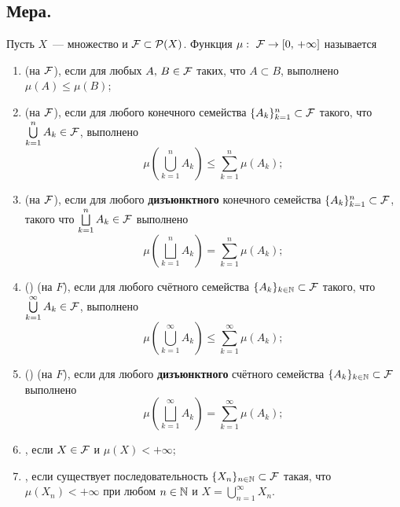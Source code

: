 \subsection{Мера.}

\begin{definition}
    Пусть $X$~--- множество и $\mathcal{F} \subset\mathcal{P}(X)$. Функция $\mu:\ \mathcal{F} \rightarrow[0,\,+\infty]$
    называется
    \begin{enumerate}
        \item {} (на $\mathcal{F} $), если для любых $A,\, B\in\mathcal{F} $ таких, что 
        $A\subset B$, выполнено $\mu(A)\leqslant \mu(B)$;

        \item {} (на $\mathcal{F} $), если для любого конечного
        семейства $\{A_k\}_{k=1}^n\subset\mathcal{F} $ такого, что $\bigcup\limits_{k=1}^n A_k\in\mathcal{F} $, 
        выполнено
        \[
            \mu\left(\bigcup_{k=1}^nA_k\right)\leqslant\sum_{k=1}^n\mu(A_k);
        \]
        
        \item {} (на $\mathcal{F} $), если для любого \textbf{дизъюнктного} 
        конечного семейства $\{A_k\}_{k=1}^n\subset\mathcal{F} $, такого что 
        $\bigsqcup\limits_{k=1}^n A_k\in\mathcal{F} $ выполнено 
        \[
            \mu\left(\bigsqcup_{k=1}^nA_k\right)=\sum_{k=1}^n\mu(A_k);
        \]
        
        \item {} () (на $F$), если для любого счётного семейства
        $\{A_k\}_{k\in\mathbb{N}}\subset\mathcal{F} $ такого, что $\bigcup\limits_{k=1}^{\infty} A_k\in\mathcal{F} $,
        выполнено 
        \[
            \mu\left(\bigcup_{k=1}^{\infty}A_k\right)\leqslant\sum_{k=1}^{\infty}\mu(A_k);
        \]
        
        \item {} () (на $F$), если для любого \textbf{дизъюнктного} счётного
        семейства $\{A_k\}_{k\in\mathbb{N}}\subset\mathcal{F} $ выполнено
        \[
            \mu\left(\bigsqcup_{k=1}^{\infty}A_k\right)=\sum_{k=1}^{\infty}\mu(A_k);
        \]
        
        \item {}, если $X\in\mathcal{F} $ и $\mu(X)<+\infty$;
        \item {}, если существует последовательность $\{X_n\}_{n\in\mathbb{N}}\subset\mathcal{F} $
        такая, что $\mu(X_n)<+\infty$ при любом $n\in\mathbb{N}$ и $X=\bigcup\limits_{n=1}^{\infty}X_n$.
    \end{enumerate}
\end{definition}